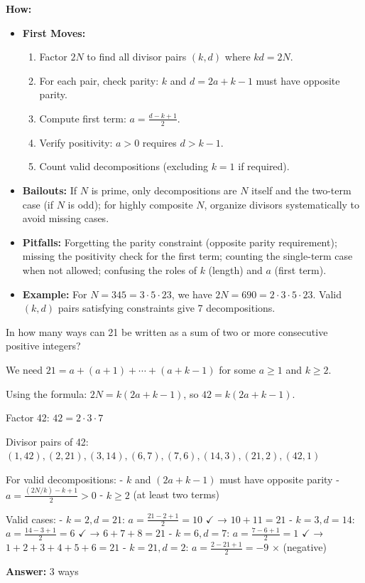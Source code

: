 \documentclass[12pt]{article}
\newenvironment{problem}[1]
{\begin{tcolorbox}[colback=blue!5!white,colframe=blue!75!black,title={#1}]}{\end{tcolorbox}}
\newenvironment{solution}
{\begin{tcolorbox}[colback=green!5!white,colframe=green!75!black,title={Solution}]}{\end{tcolorbox}}
\begin{document}
\textbf{How:}
\begin{itemize}
    \item \textbf{First Moves:}
    \begin{enumerate}[nosep]
        \item Factor $2N$ to find all divisor pairs $(k, d)$ where $kd = 2N$.
        \item For each pair, check parity: $k$ and $d = 2a + k - 1$ must have opposite parity.
        \item Compute first term: $a = \frac{d - k + 1}{2}$.
        \item Verify positivity: $a > 0$ requires $d > k - 1$.
        \item Count valid decompositions (excluding $k=1$ if required).
    \end{enumerate}
    \item \textbf{Bailouts:} If $N$ is prime, only decompositions are $N$ itself and the two-term case (if $N$ is odd); for highly composite $N$, organize divisors systematically to avoid missing cases.
    \item \textbf{Pitfalls:} Forgetting the parity constraint (opposite parity requirement); missing the positivity check for the first term; counting the single-term case when not allowed; confusing the roles of $k$ (length) and $a$ (first term).
    \item \textbf{Example:} For $N = 345 = 3 \cdot 5 \cdot 23$, we have $2N = 690 = 2 \cdot 3 \cdot 5 \cdot 23$. Valid $(k, d)$ pairs satisfying constraints give 7 decompositions.
\end{itemize}

\begin{problem}{Example: Consecutive Sum Decomposition}
In how many ways can 21 be written as a sum of two or more consecutive positive integers?
\end{problem}

\begin{solution}
We need $21 = a + (a+1) + \cdots + (a+k-1)$ for some $a \geq 1$ and $k \geq 2$.

Using the formula: $2N = k(2a + k - 1)$, so $42 = k(2a + k - 1)$.

Factor 42: $42 = 2 \cdot 3 \cdot 7$

Divisor pairs of 42: $(1,42), (2,21), (3,14), (6,7), (7,6), (14,3), (21,2), (42,1)$

For valid decompositions:
- $k$ and $(2a + k - 1)$ must have opposite parity
- $a = \frac{(2N/k) - k + 1}{2} > 0$
- $k \geq 2$ (at least two terms)

Valid cases:
- $k = 2, d = 21$: $a = \frac{21-2+1}{2} = 10$ $\checkmark$ → $10 + 11 = 21$
- $k = 3, d = 14$: $a = \frac{14-3+1}{2} = 6$ $\checkmark$ → $6 + 7 + 8 = 21$
- $k = 6, d = 7$: $a = \frac{7-6+1}{2} = 1$ $\checkmark$ → $1 + 2 + 3 + 4 + 5 + 6 = 21$
- $k = 21, d = 2$: $a = \frac{2-21+1}{2} = -9$ $\times$ (negative)

\textbf{Answer:} 3 ways
\end{solution}
\end{document}
